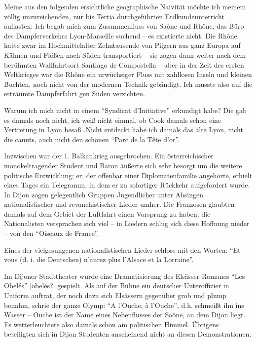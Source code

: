 \documentclass[a5paper,pagesize,10pt,twoside=true]{scrbook}
\renewcommand{\marginpar}[2][]{}
\begin{document}
Meine aus den folgenden ersichtliche geographische Naivität möchte ich meinem völlig unzureichenden, nur bis Tertia durchgeführten Erdkundeunterricht auflasten: Ich begab mich zum Zusammenfluss von Saône und Rhône, das Büro des Dampferverkehrs Lyon-Marseille suchend -- es existierte nicht. Die Rhône hatte zwar im Hochmittelalter Zehntausende von Pilgern aus ganz Europa auf Kähnen und Flößen nach Süden transportiert -- sie zogen dann weiter nach dem berühmten Wallfahrtsort Santiago de Compostella -- aber in der Zeit des ersten Weltkrieges war die Rhône ein urwüchsiger Fluss mit zahllosen Inseln und kleinen Buchten, noch nicht von der modernen Technik gebändigt. Ich musste also auf die erträumte Dampferfahrt gen Süden verzichten.

\marginpar{125}
Warum ich mich nicht in einem \enquote{Syndicat d'Initiative} erkundigt habe? Die gab es damals noch nicht, ich weiß nicht einmal, ob Cook damals schon eine Vertretung in Lyon besaß\dots Nicht entdeckt habe ich damals das alte Lyon, nicht die canuts, auch nicht den schönen \enquote{Parc de la Tête d'or}.

Inzwischen war der 1. Balkankrieg ausgebrochen. Ein österreichischer monokeltragender Student und Baron äußerte sich sehr besorgt um die weitere politische Entwicklung; er, der offenbar einer Diplomatenfamilie angehörte, erhielt eines Tages ein Telegramm, in dem er zu sofortiger Rückkehr aufgefordert wurde. In Dijon zogen gelegentlich Gruppen Jugendlicher unter Absingen nationalistischer und revanchistischer Lieder umher. Die Franzosen glaubten damals auf dem Gebiet der Luftfahrt einen Vorsprung zu haben; die Nationalisten versprachen sich viel -- in Liedern schlug sich diese Hoffnung nieder -- von den \enquote{Oiseaux de France}.

Eines der vielgesungenen nationalistischen Lieder schloss mit den Worten: \enquote{Et vous (d. i. die Deutschen) n'aurez plus l'Alsace et la Lorraine}.

Im Dijoner Stadttheater wurde eine Dramatisierung des Elsässer-Romanes \enquote{Les Obelés} [obelés?] gespielt. Als auf der Bühne ein deutscher Unteroffizier in Uniform auftrat, der noch dazu sich Elsässern gegenüber grob und plump benahm, schrie der ganze Olymp: \enquote{A l'Ouche, à l'Ouche}, d.h. schmeißt ihn ins Wasser -- Ouche ist der Name eines Nebenflusses der Saône, an dem Dijon liegt. Es wetterleuchtete also damals schon am politischen Himmel. Übrigens beteiligten sich in Dijon Studenten anscheinend nicht an diesen Demonstrationen.
\end{document}
